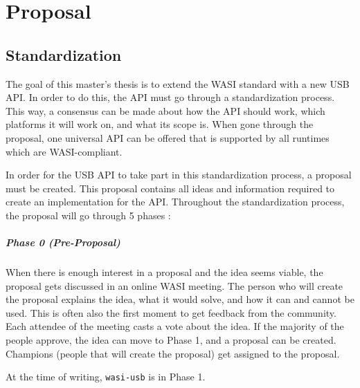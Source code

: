 \chapter{Proposal}

\section{Standardization}
The goal of this master's thesis is to extend the WASI standard with a new USB API. In order to do this, the API must go through a standardization process. This way, a consensus can be made about how the API should work, which platforms it will work on, and what its scope is. When gone through the proposal, one universal API can be offered that is supported by all runtimes which are WASI-compliant.

In order for the USB API to take part in this standardization process, a proposal must be created. This proposal contains all ideas and information required to create an implementation for the API. Throughout the standardization process, the proposal will go through 5 phases \cite{proposal_phases}:

\paragraph{Phase 0 (Pre-Proposal)}
When there is enough interest in a proposal and the idea seems viable, the proposal gets discussed in an online WASI meeting. The person who will create the proposal explains the idea, what it would solve, and how it can and cannot be used. This is often also the first moment to get feedback from the community. Each attendee of the meeting casts a vote about the idea. If the majority of the people approve, the idea can move to Phase 1, and a proposal can be created. Champions (people that will create the proposal) get assigned to the proposal.

At the time of writing, \texttt{wasi-usb} is in Phase 1.


